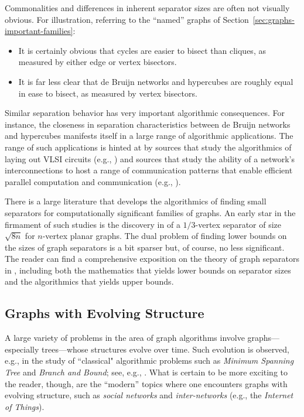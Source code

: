Commonalities and differences in inherent separator sizes are often
not visually obvious.  For illustration, referring to the ``named''
graphs of Section~\ref{sec:graphs-important-families}:
\begin{itemize}
\item
It is certainly obvious that cycles are easier to bisect than cliques,
as measured by either edge or vertex bisectors.
\item
It is far less clear that de Bruijn networks and hypercubes are
roughly equal in ease to bisect, as measured by vertex bisectors.
\end{itemize}
Similar separation behavior has very important algorithmic
consequences.  For instance, the closeness in separation
characteristics between de Bruijn networks and hypercubes manifests
itself in a large range of algorithmic applications.  The range of
such applications is hinted at by sources that study the algorithmics
of laying out VLSI circuits (e.g., \cite{Leiserson85}) and
sources that study the ability of a network's interconnections to host
a range of communication patterns that enable efficient parallel
computation and communication (e.g., \cite{AnnexsteinBR90,Leiserson85,Ullman84}).

\medskip

There is a large literature that develops the algorithmics of finding
small separators for computationally significant families of graphs.  An early star in
the firmament of such studies is the discovery in \cite{LiptonT79} of
a $1/3$-vertex separator of size $\sqrt{8n}$ for $n$-vertex planar graphs.
The dual problem of finding lower bounds on the sizes of graph
separators is a bit sparser but, of course, no less significant.  The
reader can find a comprehensive exposition on the theory of graph
separators in \cite{RosenbergH01}, including both the mathematics that
yields lower bounds on separator sizes and the algorithmics that
yields upper bounds.


\subsection{Graphs with Evolving Structure}
\label{sec:graph-evolve}

A large variety of problems in the area of graph algorithms involve graphs---especially 
trees---whose structures evolve over time.  Such evolution is observed, e.g., in the study
of ``classical" algorithmic problems such as {\it Minimum Spanning Tree} and 
{\it Branch and Bound}; see, e.g., \cite{CLRS}.  What is certain to be more exciting to the
reader, though, are the ``modern'' topics where one encounters graphs with evolving 
structure, such as {\it social networks} and {\it inter-networks} (e.g., the {\it Internet of Things}).

